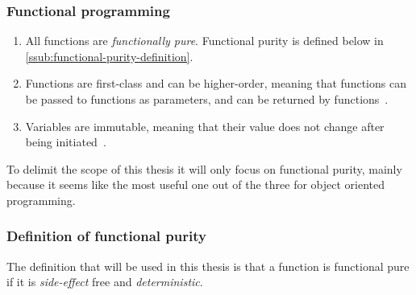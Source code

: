 \documentclass[a4paper,12pt]{article}
\begin{document}
\subsubsection{Functional programming} \label{sub:functional-programming}

\begin{enumerate}
  \item All functions are \emph{functionally pure}. Functional purity is defined below in \autoref{ssub:functional-purity-definition}.
\item Functions are first-class and can be higher-order, meaning that functions can be passed to functions as parameters, and can be returned by functions~\cite{jonas-walter}. %
\item Variables are immutable, meaning that their value does not change after being initiated~\cite{jonas-walter}. %
\end{enumerate}

To delimit the scope of this thesis it will only focus on functional purity, mainly because it seems like the most useful one out of the three for object oriented programming.%

\subsubsection{Definition of functional purity} \label{ssub:functional-purity-definition}

The definition that will be used in this thesis is that a function is functional pure if it is \textit{side-effect} free and \textit{deterministic}.
\end{document}
